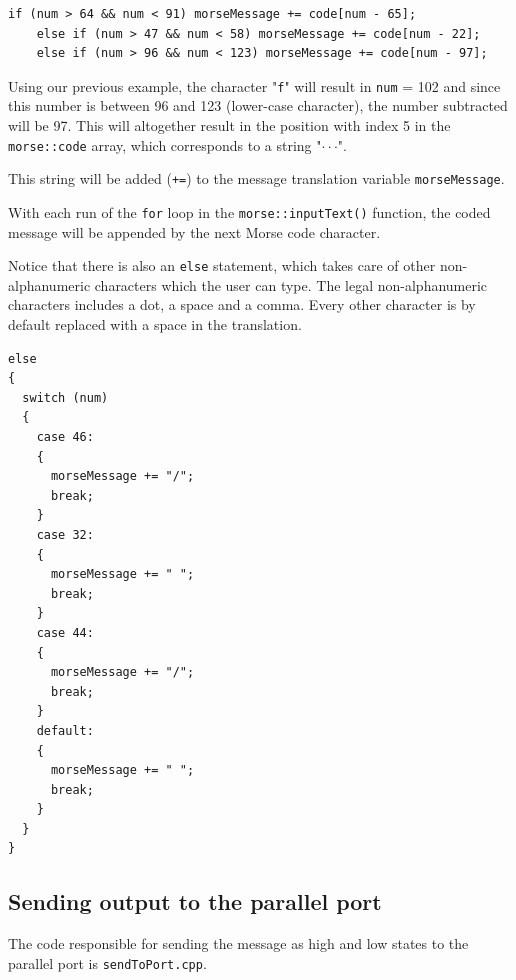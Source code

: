 \documentclass[12pt]{report}
\begin{document}
\begin{lstlisting}
if (num > 64 && num < 91) morseMessage += code[num - 65];
	else if (num > 47 && num < 58) morseMessage += code[num - 22];
	else if (num > 96 && num < 123) morseMessage += code[num - 97];
\end{lstlisting}

Using our previous example, the character "\verb|f|" will result in \verb|num| = 102 and since this number is between 96 and 123 (lower-case character), the number subtracted will be 97. This will altogether result in the position with index 5 in the \verb|morse::code| array, which corresponds to a string "$\cdot\cdot$\text{-}$\cdot$". 

This string will be added (\verb|+=|) to the message translation variable \verb|morseMessage|.

With each run of the \verb|for| loop in the \verb|morse::inputText()| function, the coded message will be appended by the next Morse code character.

Notice that there is also an \verb|else| statement, which takes care of other non-alphanumeric characters which the user can type. The legal non-alphanumeric characters includes a dot, a space and a comma. Every other character is by default replaced with a space in the translation.


\begin{lstlisting}
else
{
  switch (num)
  {
    case 46:
    {
      morseMessage += "/";
      break;
    }
    case 32:
    {
      morseMessage += " ";
      break;
    }
    case 44:
    {
      morseMessage += "/";
      break;
    }
    default:
    {
      morseMessage += " ";
      break;
    }
  }
}
\end{lstlisting}


\subsection{Sending output to the parallel port}

The code responsible for sending the message as high and low states to the parallel port is \verb|sendToPort.cpp|.
\end{document}
